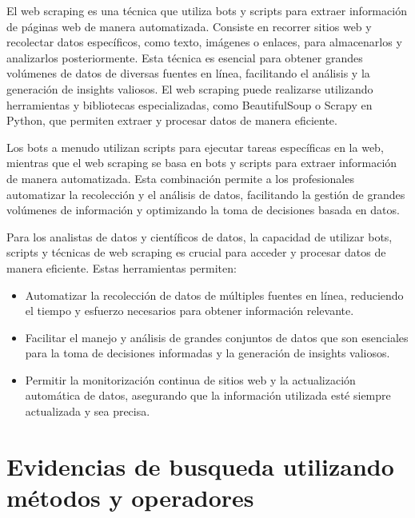 \documentclass[12pt]{article}
\begin{document}
                El web scraping es una técnica que utiliza bots y scripts para extraer información de páginas web de manera automatizada. Consiste en recorrer sitios web y recolectar datos específicos, como texto, imágenes o enlaces, para almacenarlos y analizarlos posteriormente. Esta técnica es esencial para obtener grandes volúmenes de datos de diversas fuentes en línea, facilitando el análisis y la generación de insights valiosos. El web scraping puede realizarse utilizando herramientas y bibliotecas especializadas, como BeautifulSoup o Scrapy en Python, que permiten extraer y procesar datos de manera eficiente.

                Los bots a menudo utilizan scripts para ejecutar tareas específicas en la web, mientras que el web scraping se basa en bots y scripts para extraer información de manera automatizada. Esta combinación permite a los profesionales automatizar la recolección y el análisis de datos, facilitando la gestión de grandes volúmenes de información y optimizando la toma de decisiones basada en datos.

                Para los analistas de datos y científicos de datos, la capacidad de utilizar bots, scripts y técnicas de web scraping es crucial para acceder y procesar datos de manera eficiente. Estas herramientas permiten:

                \begin{itemize}
                        \item Automatizar la recolección de datos de múltiples fuentes en línea, reduciendo el tiempo y esfuerzo necesarios para obtener información relevante.
                        \item Facilitar el manejo y análisis de grandes conjuntos de datos que son esenciales para la toma de decisiones informadas y la generación de insights valiosos.
                        \item Permitir la monitorización continua de sitios web y la actualización automática de datos, asegurando que la información utilizada esté siempre actualizada y sea precisa.
                \end{itemize}


        
                
        \newpage
        \section{Evidencias de busqueda utilizando métodos y operadores}      
                
\end{document}
